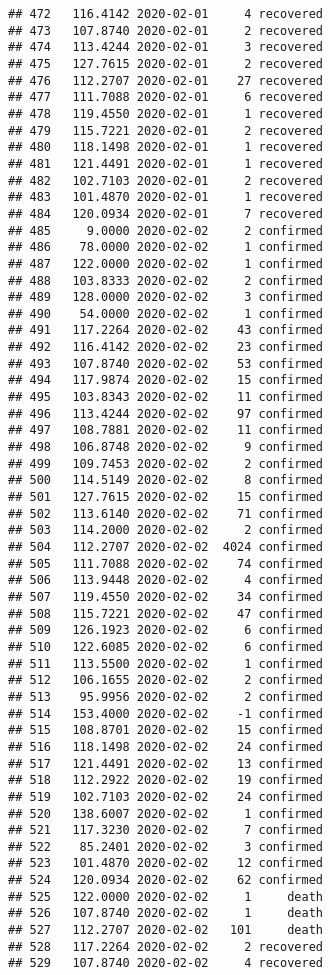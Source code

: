 \documentclass[
]{article}
\begin{document}
\begin{verbatim}
## 472   116.4142 2020-02-01     4 recovered
## 473   107.8740 2020-02-01     2 recovered
## 474   113.4244 2020-02-01     3 recovered
## 475   127.7615 2020-02-01     2 recovered
## 476   112.2707 2020-02-01    27 recovered
## 477   111.7088 2020-02-01     6 recovered
## 478   119.4550 2020-02-01     1 recovered
## 479   115.7221 2020-02-01     2 recovered
## 480   118.1498 2020-02-01     1 recovered
## 481   121.4491 2020-02-01     1 recovered
## 482   102.7103 2020-02-01     2 recovered
## 483   101.4870 2020-02-01     1 recovered
## 484   120.0934 2020-02-01     7 recovered
## 485     9.0000 2020-02-02     2 confirmed
## 486    78.0000 2020-02-02     1 confirmed
## 487   122.0000 2020-02-02     1 confirmed
## 488   103.8333 2020-02-02     2 confirmed
## 489   128.0000 2020-02-02     3 confirmed
## 490    54.0000 2020-02-02     1 confirmed
## 491   117.2264 2020-02-02    43 confirmed
## 492   116.4142 2020-02-02    23 confirmed
## 493   107.8740 2020-02-02    53 confirmed
## 494   117.9874 2020-02-02    15 confirmed
## 495   103.8343 2020-02-02    11 confirmed
## 496   113.4244 2020-02-02    97 confirmed
## 497   108.7881 2020-02-02    11 confirmed
## 498   106.8748 2020-02-02     9 confirmed
## 499   109.7453 2020-02-02     2 confirmed
## 500   114.5149 2020-02-02     8 confirmed
## 501   127.7615 2020-02-02    15 confirmed
## 502   113.6140 2020-02-02    71 confirmed
## 503   114.2000 2020-02-02     2 confirmed
## 504   112.2707 2020-02-02  4024 confirmed
## 505   111.7088 2020-02-02    74 confirmed
## 506   113.9448 2020-02-02     4 confirmed
## 507   119.4550 2020-02-02    34 confirmed
## 508   115.7221 2020-02-02    47 confirmed
## 509   126.1923 2020-02-02     6 confirmed
## 510   122.6085 2020-02-02     6 confirmed
## 511   113.5500 2020-02-02     1 confirmed
## 512   106.1655 2020-02-02     2 confirmed
## 513    95.9956 2020-02-02     2 confirmed
## 514   153.4000 2020-02-02    -1 confirmed
## 515   108.8701 2020-02-02    15 confirmed
## 516   118.1498 2020-02-02    24 confirmed
## 517   121.4491 2020-02-02    13 confirmed
## 518   112.2922 2020-02-02    19 confirmed
## 519   102.7103 2020-02-02    24 confirmed
## 520   138.6007 2020-02-02     1 confirmed
## 521   117.3230 2020-02-02     7 confirmed
## 522    85.2401 2020-02-02     3 confirmed
## 523   101.4870 2020-02-02    12 confirmed
## 524   120.0934 2020-02-02    62 confirmed
## 525   122.0000 2020-02-02     1     death
## 526   107.8740 2020-02-02     1     death
## 527   112.2707 2020-02-02   101     death
## 528   117.2264 2020-02-02     2 recovered
## 529   107.8740 2020-02-02     4 recovered

\end{verbatim}
\end{document}
